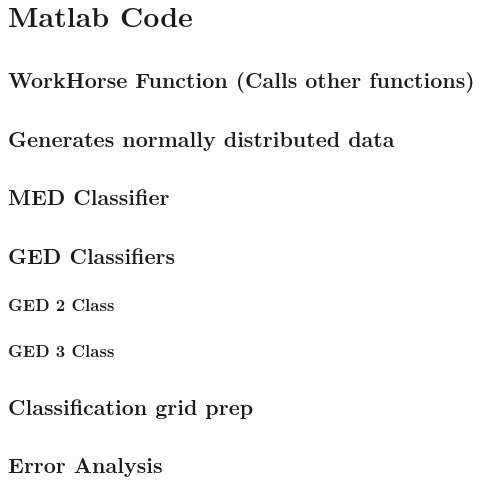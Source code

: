 \appendix
\newpage

\section{Matlab Code}

\subsection{WorkHorse Function (Calls other functions)}


\subsection{Generates normally distributed data}


\subsection{MED Classifier}


\subsection{GED Classifiers}
\subsubsection{GED 2 Class}

\subsubsection{GED 3 Class}






\subsection{Classification grid prep}


\subsection{Error Analysis}







